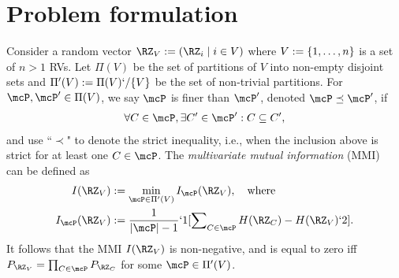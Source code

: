 \section{Problem formulation}
\label{sec:problem}
Consider a random vector $\RZ_V:=(\RZ_i \mid i \in V)$ where $V:=\{1,\dots,n\}$ is a set of $n>1$
RVs. Let $\Pi(V)$ be the set of partitions of $V$ into non-empty disjoint sets and
$\Pi'(V):=\Pi(V)`/\{V\}$ be the set of non-trivial partitions.
For $\mcP, \mcP' \in \Pi(V)$, we say $\mcP$ is finer than $\mcP'$, denoted $\mcP \preceq \mcP'$, if
\begin{align}
	\label{eq:finer}
	\forall C \in \mcP,  \exists  C' \in \mcP' : C \subseteq C',
\end{align}
and use ``$\prec$" to denote the strict inequality, i.e., when the inclusion above is strict for at least
one $C \in \mcP$.
The \emph{multivariate mutual information} (MMI)~\cite{chan15mi} can be defined as
\begin{subequations}
	\label{eq:mmi}
	\begin{align}
		I(\RZ_V)&:=\min_{\mcP\in \Pi'(V)} I_{\mcP}(\RZ_V), \kern1em \text{where} \label{eq:I}\\
		I_{\mcP}(\RZ_V)&:= \frac{1}{|\mcP|-1}`1[\sum\nolimits_{C\in \mcP}H(\RZ_C) - H(\RZ_V) `2].\label{eq:IP}
	\end{align}
\end{subequations}
It follows that the MMI $I(\RZ_V)$ is non-negative, and is equal to zero iff $P_{\RZ_V}=\prod_{C\in \mcP}
P_{\RZ_C}$ for some $\mcP \in \Pi'(V)$.

